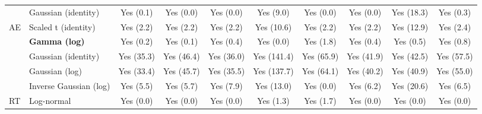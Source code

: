 \begin{table}[H]
{\begin{tabular}[t]{llcccccccc}
\cmidrule{2-10}
 & Gaussian (identity) & Yes (0.1) & Yes (0.0) & Yes (0.0) & Yes (9.0) & Yes (0.0) & Yes (0.0) & Yes (18.3) & Yes (0.3)\\
\cmidrule{2-10}
\multirow{-3}{*}{\raggedright\arraybackslash AE} & Scaled t (identity) & Yes (2.2) & Yes (2.2) & Yes (2.2) & Yes (10.6) & Yes (2.2) & Yes (2.2) & Yes (12.9) & Yes (2.4)\\
\cmidrule{1-10}
 & \textbf{Gamma (log)} & Yes (0.2) & Yes (0.1) & Yes (0.4) & Yes (0.0) & Yes (1.8) & Yes (0.4) & Yes (0.5) & Yes (0.8)\\
\cmidrule{2-10}
 & Gaussian (identity) & Yes (35.3) & Yes (46.4) & Yes (36.0) & Yes (141.4) & Yes (65.9) & Yes (41.9) & Yes (42.5) & Yes (57.5)\\
\cmidrule{2-10}
 & Gaussian (log) & Yes (33.4) & Yes (45.7) & Yes (35.5) & Yes (137.7) & Yes (64.1) & Yes (40.2) & Yes (40.9) & Yes (55.0)\\
\cmidrule{2-10}
 & Inverse Gaussian (log) & Yes (5.5) & Yes (5.7) & Yes (7.9) & Yes (13.0) & Yes (0.0) & Yes (6.2) & Yes (20.6) & Yes (6.5)\\
\cmidrule{2-10}
\multirow{-5}{*}{\raggedright\arraybackslash RT} & Log-normal & Yes (0.0) & Yes (0.0) & Yes (0.0) & Yes (1.3) & Yes (1.7) & Yes (0.0) & Yes (0.0) & Yes (0.0)\\
\bottomrule
\end{tabular}}
\end{table}
